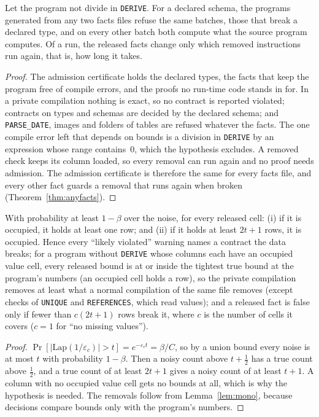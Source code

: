 \begin{corollary}\label{cor:outcome}
Let the program not divide in \texttt{DERIVE}. For a declared schema, the programs generated from any two
facts files refuse the same batches, those that break a declared type, and on every other batch both
compute what the source program computes. Of a run, the released facts change only which removed
instructions run again, that is, how long it takes.
\end{corollary}
\begin{proof}
The admission certificate holds the declared types, the facts that keep the program free of compile
errors, and the proofs no run-time code stands in for. In a private compilation nothing is exact, so no
contract is reported violated; contracts on types and schemas are decided by the declared schema; and
\texttt{PARSE\_DATE}, images and folders of tables are refused whatever the facts. The one compile error
left that depends on bounds is a division in \texttt{DERIVE} by an expression whose range contains~0,
which the hypothesis excludes. A removed check keeps its column loaded, so every removal can run again
and no proof needs admission. The admission certificate is therefore the same for every facts file, and every other fact
guards a removal that runs again when broken (Theorem~\ref{thm:anyfacts}).
\end{proof}

\begin{lemma}\label{lem:utility}
With probability at least $1-\beta$ over the noise, for every released cell: (i) if it is occupied, it
holds at least one row; and (ii) if it holds at least $2t + 1$ rows, it is occupied. Hence every
``likely violated'' warning names a contract the data breaks; for a program without \texttt{DERIVE}
whose columns each have an occupied value cell, every released bound is at or inside the tightest true
bound at the program's numbers (an occupied cell holds a row), so the private compilation removes at
least what a normal compilation of
the same file removes (except checks of \texttt{UNIQUE} and \texttt{REFERENCES}, which read values); and
a released fact is false only if fewer than $c(2t + 1)$ rows break it, where $c$ is the number of cells
it covers ($c = 1$ for ``no missing values'').
\end{lemma}
\begin{proof}
$\Pr[|\mathrm{Lap}(1/\varepsilon_c)| > t] = e^{-\varepsilon_c t} = \beta/C$, so by a union bound every
noise is at most $t$ with probability $1-\beta$. Then a noisy count above $t + \frac12$ has a true count
above $\frac12$, and a true count of at least $2t+1$ gives a noisy count of at least $t+1$. A column with
no occupied value cell gets no bounds at all, which is why the hypothesis is needed. The removals follow
from Lemma~\ref{lem:mono}, because decisions compare bounds only with the program's numbers.
\end{proof}

